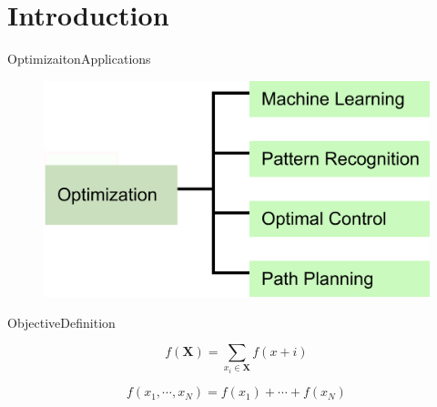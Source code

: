 \section{Introduction}

\begin{frame}{Optimizaiton}{Applications}
\begin{figure}
	\centering
	\includegraphics[width = .8\textwidth]{./figure/optimization}
\end{figure}
\end{frame}

\begin{frame}{Objective}{Definition}
\begin{block}{}
\begin{equation}
\nonumber
f( \mathbf{X} ) = \sum_{ x_{i} \in \mathbf{X} } f(x+{i})
\end{equation}
\end{block}
\end{frame}

\begin{frame}
\begin{block}{}
\begin{equation}
\nonumber
f(x_{1} , \cdots , x_{N} )= f(x_{1}) + \cdots + f(x_{N})
\end{equation}
\end{block}
\end{frame}

